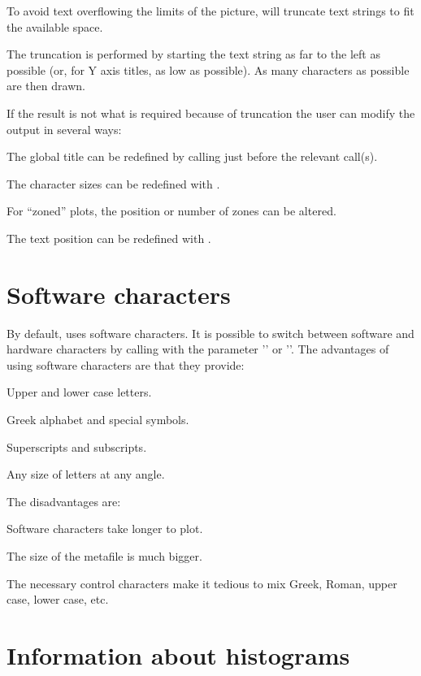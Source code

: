 To avoid text overflowing the limits of the picture, \HPLOT{} will truncate text
strings to fit the available space.

The truncation is performed by starting the text string as far to the left as
possible (or, for Y axis titles, as low as possible). As many characters as 
possible are then drawn.

If the result is not what is required because of truncation the user can modify
the output in several ways:
\begin{UL}
\item The \HBOOK{} global title can be redefined by calling  just
      before the relevant \HPLOT{} call(s).
\item The character sizes can be redefined with .
\item For ``zoned'' plots, the position or number of zones can be altered.
\item The text position can be redefined with .
\end{UL}

\section{Software characters}

By default, \HPLOT{} uses software characters. It is possible to switch between
software and hardware characters by calling  with the parameter 
'' or ''. The advantages of using software characters are
that they provide:
\begin{UL}
\item Upper and lower case letters.
\item Greek alphabet and special symbols.
\item Superscripts and subscripts.
\item Any size of letters at any angle.
\end{UL}
The disadvantages are:
\begin{UL}
\item Software characters take longer to plot.
\item The size of the \GKS{} metafile is much bigger.
\item The necessary control characters make it tedious to mix Greek, Roman,
      upper case, lower case, etc.
\end{UL}


\section{Information about histograms}

